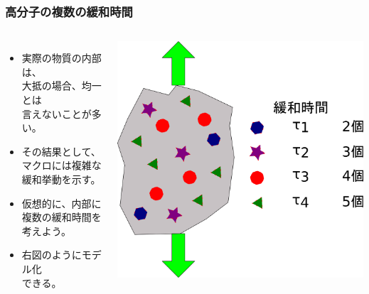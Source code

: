 \documentclass[12pt, dvipdfmx]{beamer}
\begin{document}
\begin{frame}
	\frametitle{高分子の複数の緩和時間}
		\begin{columns}[c, onlytextwidth]
			\begin{itemize}
				\item 実際の物質の内部は、\\大抵の場合、均一とは\\言えないことが多い。
				\item その結果として、マクロには複雑な緩和挙動を示す。
				\item \alert{仮想的}に、内部に\alert{複数の緩和時間}を考えよう。
				\item 右図のように\alert{モデル化}\\できる。
			\end{itemize}
				\includegraphics[width=\textwidth]{relux_multi.png}
		\end{columns}
\end{frame}
\end{document}

